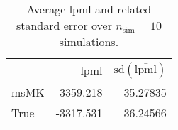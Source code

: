 \begin{table}[H]

\caption{Average lpml and related standard error over $n_{\text{sim}} = 10$ simulations.}
\centering
\begin{tabular}[t]{lrr}
\toprule
  & $\overbar{\text{lpml}}$ & $\text{sd}(\overbar{\text{lpml}})$\\
\midrule
msMK & -3359.218 & 35.27835\\
True & -3317.531 & 36.24566\\
\bottomrule
\end{tabular}
\end{table}